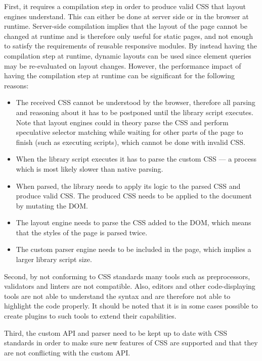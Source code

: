 \documentclass{acm_proc_article-sp}
\newcommand{\gls}[1]{#1}
\begin{document}
  First, it requires a compilation step in order to produce valid \gls{CSS} that layout engines understand.
  This can either be done at server side or in the \gls{browser} at runtime.
  Server-side compilation implies that the layout of the page cannot be changed at runtime and is therefore only useful for static pages, and not enough to satisfy the requirements of reusable responsive modules.
  By instead having the compilation step at runtime, dynamic layouts can be used since element queries may be re-evaluated on layout changes.
  However, the performance impact of having the compilation step at runtime can be significant for the following reasons:
  \begin{itemize}
    \item The received \gls{CSS} cannot be understood by the \gls{browser}, therefore all parsing and reasoning about it has to be postponed until the library script executes.
    Note that layout engines could in theory parse the \gls{CSS} and perform speculative selector matching while waiting for other parts of the page to finish (such as executing scripts), which cannot be done with invalid \gls{CSS}.
    \item When the library script executes it has to parse the custom \gls{CSS} --- a process which is most likely slower than \gls{native} parsing.
    \item When parsed, the library needs to apply its logic to the parsed \gls{CSS} and produce valid \gls{CSS}. The produced \gls{CSS} needs to be applied to the \gls{document} by mutating the \gls{DOM}.
    \item The \gls{layout engine} needs to parse the \gls{CSS} added to the \gls{DOM}, which means that the styles of the page is parsed twice.
    \item The custom parser engine needs to be included in the page, which implies a larger library script size.
  \end{itemize}
  
  Second, by not conforming to \gls{CSS} standards many tools such as preprocessors, validators and linters are not compatible.
  Also, editors and other code-displaying tools are not able to understand the syntax and are therefore not able to highlight the code properly.
  It should be noted that it is in some cases possible to create plugins to such tools to extend their capabilities.

  Third, the custom \gls{API} and parser need to be kept up to date with \gls{CSS} standards in order to make sure new features of \gls{CSS} are supported and that they are not conflicting with the custom \gls{API}.
\end{document}
